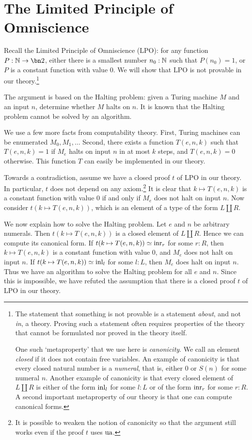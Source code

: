 \section{The Limited Principle of Omniscience}

\begin{remark}\label{rem:LPO-solves-halting problem}
Recall the Limited Principle of Omniscience (LPO):
  for any function $P:\NN\to\bn 2$, 
  either there is a smallest number $n_0:\mathbb{N}$ such that $P(n_0)=1$,
  or $P$ is a constant function with value $0$.
We will show that LPO is not provable in our theory.\footnote{%
The statement that something is not provable is a statement \emph{about}, 
and not \emph{in}, a theory. Proving such a statement often requires
properties of the theory that cannot be formulated nor proved in the theory itself.

One such `metaproperty' that we use here is \emph{canonicity}.
We call an element \emph{closed} if it does not contain free variables.
An example of canonicity is that every closed natural number is a \emph{numeral},
that is, either $0$ or $S(n)$ for some numeral $n$.
Another example of canonicity is that every closed element of $L\coprod R$
is either of the form $\inl{l}$ for some $l:L$ or 
of the form $\inr{r}$ for some $r:R$.
A second important metaproperty of our theory is that one can compute canonical forms.
}%

The argument is based on the Halting problem: given a Turing machine 
$M$ and an input $n$, determine whether $M$ halts on $n$.
It is known that the Halting problem cannot be solved by an algorithm.

We use a few more facts from computability theory.
First, Turing machines can be enumerated $M_0,M_1,\ldots$
Second, there exists a function $T(e,n,k)$ such that $T(e,n,k) = 1$
if $M_e$ halts on input $n$ in at most $k$ steps, and $T(e,n,k) = 0$
otherwise. This function $T$ can easily be implemented in our theory.

Towards a contradiction, assume we have a closed proof $t$ of LPO in our theory.
In particular, $t$ does not depend on any axiom.\footnote{It is possible to weaken the notion
of canonicity so that the argument still works even if the proof $t$ uses $\ua$.}
It is clear that $k\mapsto T(e,n,k)$ is a constant function with value $0$
if and only if $M_e$ does not halt on input $n$. Now consider $t(k\mapsto T(e,n,k))$,
which is an element of a type of the form $L\coprod R$.

We now explain how to solve the Halting problem.
Let $e$ and $n$ be arbitrary numerals. 
Then $t(k\mapsto T(e,n,k))$ is a closed element of $L\coprod R$.
Hence we can compute its canonical form. If $t(k\mapsto T(e,n,k))\jdeq\inr{r}$ for some
$r:R$, then $k\mapsto T(e,n,k)$ is a constant function with value $0$,
and $M_e$ does not halt on input $n$. If $t(k\mapsto T(e,n,k))\jdeq\inl{l}$ for some
$l:L$, then $M_e$ does halt on input $n$.
Thus we have an algorithm to solve the Halting problem
for all $e$ and $n$. Since this is impossible, we have refuted the assumption
that there is a closed proof $t$ of LPO in our theory.
\end{remark}

